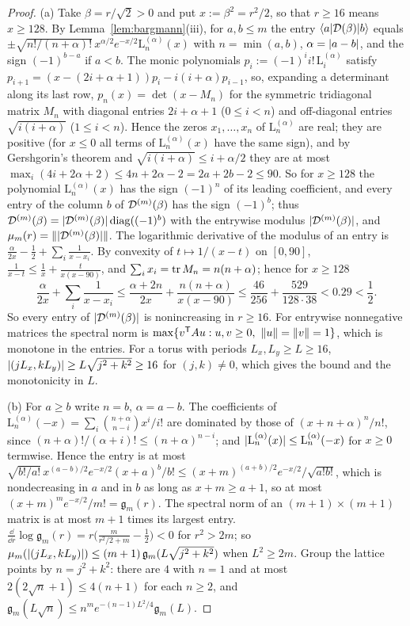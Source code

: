 \begin{proof}
(a) Take $\beta=r/\sqrt2>0$ and put $x:=\beta^2=r^2/2$, so that $r\ge16$ means $x\ge128$. By Lemma~\ref{lem:bargmann}(iii), for
$a,b\le m$ the entry $\langle a\rvert\mathcal{D}(\beta)\lvert b\rangle$ equals $\pm\sqrt{n!/(n+\alpha)!}\,x^{\alpha/2}e^{-x/2}\mathrm L_n^{(\alpha)}(x)$ with
$n=\min(a,b)$, $\alpha=\lvert a-b\rvert$, and the sign $(-1)^{b-a}$ if $a<b$. The monic polynomials $p_i:=(-1)^ii!\,\mathrm L_i^{(\alpha)}$
satisfy $p_{i+1}=(x-(2i+\alpha+1))p_i-i(i+\alpha)p_{i-1}$, so, expanding a determinant along its last row, $p_n(x)=\det(x-M_n)$ for
the symmetric tridiagonal matrix $M_n$ with diagonal entries $2i+\alpha+1$ ($0\le i<n$) and off-diagonal entries $\sqrt{i(i+\alpha)}$
($1\le i<n$). Hence the zeros $x_1,\dots,x_n$ of $\mathrm L_n^{(\alpha)}$ are real; they are positive (for $x\le0$ all terms of
$\mathrm L_n^{(\alpha)}(x)$ have the same sign), and by Gershgorin's theorem and $\sqrt{i(i+\alpha)}\le i+\alpha/2$ they are at most
$\max_i(4i+2\alpha+2)\le4n+2\alpha-2=2a+2b-2\le90$. So for $x\ge128$ the polynomial $\mathrm L_n^{(\alpha)}(x)$ has the sign
$(-1)^n$ of its leading coefficient, and every entry of the column $b$ of $\mathcal{D}^{(m)}(\beta)$ has the sign $(-1)^b$; thus
$\mathcal{D}^{(m)}(\beta)=\lvert\mathcal{D}^{(m)}(\beta)\rvert\,\mathrm{diag}((-1)^b)$ with the entrywise modulus $\lvert\mathcal{D}^{(m)}(\beta)\rvert$, and
$\mu_m(r)=\lVert\lvert\mathcal{D}^{(m)}(\beta)\rvert\rVert$. The logarithmic derivative of the modulus of an entry is
$\frac\alpha{2x}-\frac12+\sum_i\frac1{x-x_i}$. By convexity of $t\mapsto1/(x-t)$ on $[0,90]$, $\frac1{x-t}\le\frac1x+\frac t{x(x-90)}$,
and $\sum_ix_i=\operatorname{tr} M_n=n(n+\alpha)$; hence for $x\ge128$
\[
\frac\alpha{2x}+\sum_i\frac1{x-x_i}\le\frac{\alpha+2n}{2x}+\frac{n(n+\alpha)}{x(x-90)}\le\frac{46}{256}+\frac{529}{128\cdot38}<0.29<\frac12 .
\]
So every entry of $\lvert\mathcal{D}^{(m)}(\beta)\rvert$ is nonincreasing in $r\ge16$. For entrywise nonnegative matrices the spectral norm is
$\max\{v^{\mathsf T}Au:u,v\ge0,\ \lVert u\rVert=\lVert v\rVert=1\}$, which is monotone in the entries. For a torus with periods $L_x,L_y\ge L\ge16$,
$\lvert(jL_x,kL_y)\rvert\ge L\sqrt{j^2+k^2}\ge16$ for $(j,k)\neq0$, which gives the bound and the monotonicity in $L$.

(b) For $a\ge b$ write $n=b$, $\alpha=a-b$. The coefficients of $\mathrm L_n^{(\alpha)}(-x)=\sum_i\binom{n+\alpha}{n-i}x^i/i!$ are
dominated by those of $(x+n+\alpha)^n/n!$, since $(n+\alpha)!/(\alpha+i)!\le(n+\alpha)^{n-i}$; and $\lvert\mathrm L_n^{(\alpha)}(x)\rvert\le\mathrm L_n^{(\alpha)}(-x)$
for $x\ge0$ termwise. Hence the entry is at most $\sqrt{b!/a!}\,x^{(a-b)/2}e^{-x/2}(x+a)^b/b!\le(x+m)^{(a+b)/2}e^{-x/2}/\sqrt{a!b!}$,
which is nondecreasing in $a$ and in $b$ as long as $x+m\ge a+1$, so at most $(x+m)^me^{-x/2}/m!=\mathfrak g_m(r)$. The spectral norm of
an $(m+1)\times(m+1)$ matrix is at most $m+1$ times its largest entry. $\frac{\dd}{\dd r}\log\mathfrak g_m(r)=r\bigl(\frac m{r^2/2+m}-\frac12\bigr)<0$ for
$r^2>2m$; so $\mu_m(\lvert(jL_x,kL_y)\rvert)\le(m+1)\,\mathfrak g_m(L\sqrt{j^2+k^2})$ when $L^2\ge2m$. Group the lattice points by
$n=j^2+k^2$: there are $4$ with $n=1$ and at most $2(2\sqrt n+1)\le4(n+1)$ for each $n\ge2$, and
$\mathfrak g_m(L\sqrt n)\le n^me^{-(n-1)L^2/4}\mathfrak g_m(L)$.


\end{proof}
